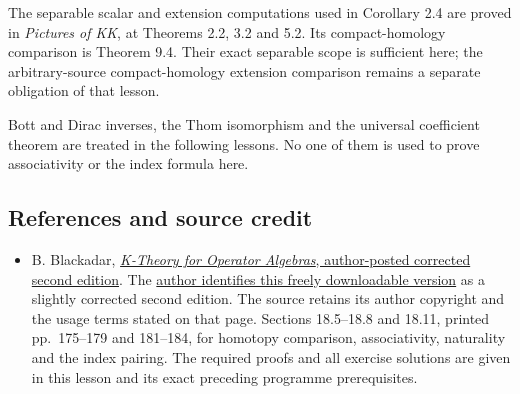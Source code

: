 \documentclass[
  11pt,
]{article}
\providecommand{\tightlist}{%
  \setlength{\itemsep}{0pt}\setlength{\parskip}{0pt}}
\begin{document}
The separable scalar and extension computations used in Corollary 2.4
are proved in \emph{Pictures of KK}, at Theorems 2.2, 3.2 and 5.2. Its
compact-homology comparison is Theorem 9.4. Their exact separable scope
is sufficient here; the arbitrary-source compact-homology extension
comparison remains a separate obligation of that lesson.

Bott and Dirac inverses, the Thom isomorphism and the universal
coefficient theorem are treated in the following lessons. No one of them
is used to prove associativity or the index formula here.

\subsection{References and source
credit}\label{references-and-source-credit}

\begin{itemize}
\tightlist
\item
  B. Blackadar,
  \href{https://www.bruceblackadar.com/Mathematics/book6.pdf}{\emph{K-Theory
  for Operator Algebras}, author-posted corrected second edition}. The
  \href{https://www.bruceblackadar.com/mathpubs.html}{author identifies
  this freely downloadable version} as a slightly corrected second
  edition. The source retains its author copyright and the usage terms
  stated on that page. Sections 18.5--18.8 and 18.11, printed
  pp.~175--179 and 181--184, for homotopy comparison, associativity,
  naturality and the index pairing. The required proofs and all exercise
  solutions are given in this lesson and its exact preceding programme
  prerequisites.
\end{itemize}
\end{document}
